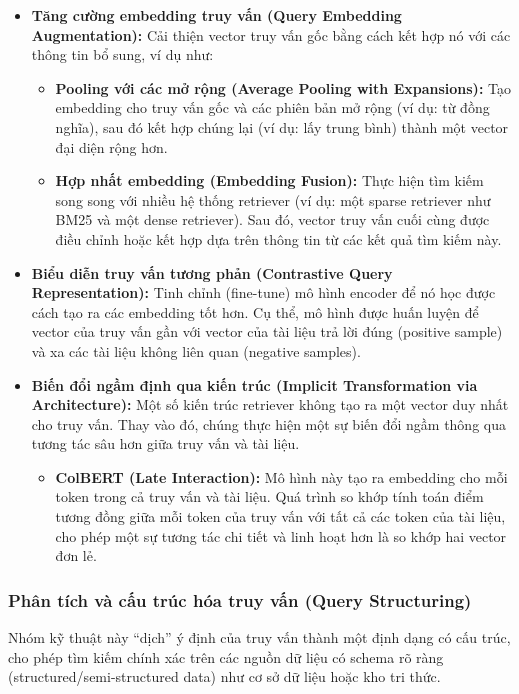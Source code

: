 \begin{itemize}
	\item \textbf{Tăng cường embedding truy vấn (Query Embedding Augmentation):}
	Cải thiện vector truy vấn gốc bằng cách kết hợp nó với các thông tin bổ sung, ví dụ như:
	\begin{itemize}
		\item \textbf{Pooling với các mở rộng (Average Pooling with Expansions):}
		Tạo embedding cho truy vấn gốc và các phiên bản mở rộng (ví dụ: từ đồng nghĩa), sau đó kết hợp chúng lại (ví dụ: lấy trung bình) thành một vector đại diện rộng hơn.
		\item \textbf{Hợp nhất embedding (Embedding Fusion):}
		Thực hiện tìm kiếm song song với nhiều hệ thống retriever (ví dụ: một sparse retriever như BM25 và một dense retriever). Sau đó, vector truy vấn cuối cùng được điều chỉnh hoặc kết hợp dựa trên thông tin từ các kết quả tìm kiếm này.
	\end{itemize}
	
	\item \textbf{Biểu diễn truy vấn tương phản (Contrastive Query Representation):}
	Tinh chỉnh (fine-tune) mô hình encoder để nó học được cách tạo ra các embedding tốt hơn. Cụ thể, mô hình được huấn luyện để vector của truy vấn gần với vector của tài liệu trả lời đúng (positive sample) và xa các tài liệu không liên quan (negative samples).
	
	\item \textbf{Biến đổi ngầm định qua kiến trúc (Implicit Transformation via Architecture):}
	Một số kiến trúc retriever không tạo ra một vector duy nhất cho truy vấn. Thay vào đó, chúng thực hiện một sự biến đổi ngầm thông qua tương tác sâu hơn giữa truy vấn và tài liệu.
	\begin{itemize}
		\item \textbf{ColBERT (Late Interaction):} \cite{khattab2020colbert} 
		Mô hình này tạo ra embedding cho mỗi token trong cả truy vấn và tài liệu. Quá trình so khớp tính toán điểm tương đồng giữa mỗi token của truy vấn với tất cả các token của tài liệu, cho phép một sự tương tác chi tiết và linh hoạt hơn là so khớp hai vector đơn lẻ.
	\end{itemize}
\end{itemize}

\subsubsection{Phân tích và cấu trúc hóa truy vấn (Query Structuring)}
\label{sssec:query_structuring}
Nhóm kỹ thuật này “dịch” ý định của truy vấn thành một định dạng có cấu trúc, cho phép tìm kiếm chính xác trên các nguồn dữ liệu có schema rõ ràng (structured/semi-structured data) như cơ sở dữ liệu hoặc kho tri thức.

